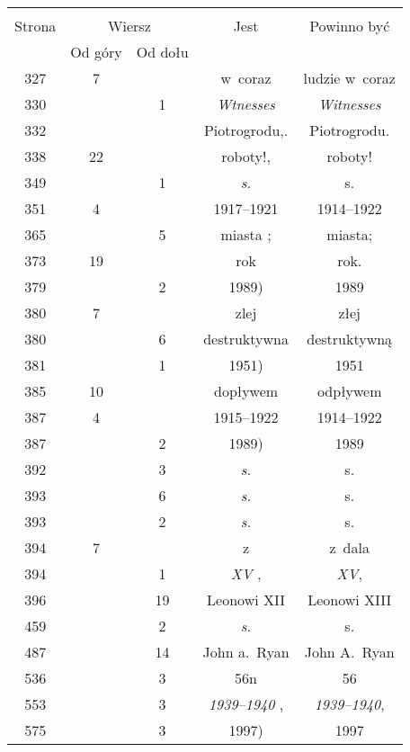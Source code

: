 \documentclass[a4paper,11pt]{article}
\begin{document}
\begin{center}
  \begin{tabular}{|c|c|c|c|c|}
    \hline
    & \multicolumn{2}{c|}{} & & \\
    Strona & \multicolumn{2}{c|}{Wiersz}& Jest & Powinno być \\ \cline{2-3}
    & Od góry & Od dołu &  &  \\ \hline
    327 & 7 & & w~coraz & ludzie w~coraz \\
    330 & & 1 & \emph{Wtnesses} & \emph{Witnesses} \\
    332 & & & Piotrogrodu,. & Piotrogrodu. \\
    338 & 22 & & roboty!, & roboty! \\
    349 & & 1 & \emph{s.} & s. \\
    351 & 4 & & 1917--1921 & 1914--1922 \\
    365 & & 5 & miasta ; & miasta; \\
    373 & 19 & & rok & rok. \\
    379 & & 2 & 1989) & 1989 \\
    380 & 7 & & zlej & złej \\
    380 & & 6 & destruktywna & destruktywną \\
    381 & & 1 & 1951) & 1951 \\
    385 & 10 & & dopływem & odpływem \\
    387 & 4 & & 1915--1922 & 1914--1922 \\
    387 & & 2 & 1989) & 1989 \\
    392 & & 3 & \emph{s.} & s. \\
    393 & & 6 & \emph{s.} & s. \\
    393 & & 2 & \emph{s.} & s. \\
    394 & 7 & & z & z~dala \\
    394 & & 1 & \emph{XV} , & \emph{XV}, \\
    396 & & 19 & Leonowi XII & Leonowi XIII \\
    459 & & 2 & \emph{s.} & s. \\
    487 & & 14 & John a.~Ryan & John A.~Ryan \\
    536 & & 3 & 56n & 56 \\
    553 & & 3 & \emph{1939--1940} , & \emph{1939--1940}, \\
    575 & & 3 & 1997) & 1997 \\
    \hline
  \end{tabular}


\end{center}
\end{document}
